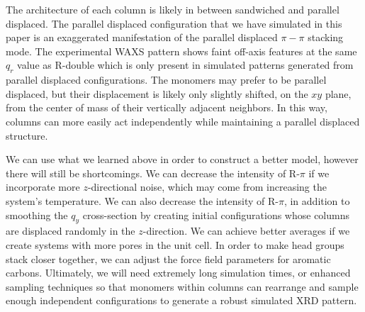 \documentclass[journal=jpcbfk,manuscript=article]{achemso}
\begin{document}
  The architecture of each column is likely in between sandwiched and parallel
  displaced. The parallel displaced configuration that we have simulated in this
  paper is an exaggerated manifestation of the parallel displaced $\pi-\pi$
  stacking mode. The experimental WAXS pattern shows faint off-axis features at the
  same $q_r$ value as R-double which is only present in simulated patterns generated from
  parallel displaced configurations. The monomers may prefer to be parallel displaced, but
  their displacement is likely only slightly shifted, on the $xy$ plane, from the
  center of mass of their vertically adjacent neighbors. In this way, columns can
  more easily act independently while maintaining a parallel displaced structure.   
  
  We can use what we learned above in order to construct a better model,
  however there will still be shortcomings. We can decrease the intensity of
  R-$\pi$ if we incorporate more $z$-directional noise, which may come from
  increasing the system's temperature. 
  We can also decrease the intensity of R-$\pi$, in addition to smoothing the
  $q_y$ cross-section by creating initial configurations whose columns are
  displaced randomly in the $z$-direction. We can achieve better averages if we
  create systems with more pores in the unit cell. In order to make head groups
  stack closer together, we can adjust the force field parameters for aromatic 
  carbons. Ultimately, we will need extremely long simulation times, or enhanced
  sampling techniques so that monomers within columns can rearrange and sample
  enough independent configurations to generate a robust simulated XRD pattern. 
 
\end{document}
